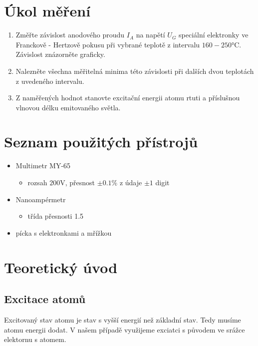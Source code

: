 \documentclass[titlepage]{article}
\begin{document}
\begin{titlepage}
 
\end{titlepage}

\tableofcontents
\newpage

\section{Úkol měření}

\begin{enumerate}
 \item Změřte závislost anodového proudu $I_A$ na napětí $U_G$ speciální elektronky ve Franckově - Hertzově pokusu při vybrané teplotě z intervalu $160  - 250 \si{\celsius}$. Závislost znázorněte graficky.

 \item Nalezněte všechna měřitelná minima této závislosti při dalších dvou teplotách z uvedeného intervalu.

 \item Z naměřených hodnot stanovte excitační energii atomu rtuti a příslušnou vlnovou délku emitovaného světla.
\end{enumerate}

\section{Seznam použitých přístrojů}
\begin{itemize}
\item Multimetr MY-65
 \begin{itemize}
  \item rozsah $200 \si{\volt}$, přesnost $\pm 0.1 \%$ z údaje $\pm 1$ digit
 \end{itemize}

\item Nanoampérmetr
 \begin{itemize}
  \item třída přesnosti 1.5
 \end{itemize}

\item pícka s elektronkami a mřížkou
\end{itemize}

\section{Teoretický úvod}
\subsection{Excitace atomů}
Excitovaný stav atomu je stav s vyšší energií než základní stav. Tedy musíme atomu energii dodat. V našem případě využijeme exciatci s původem ve srážce elektornu s atomem.
\end{document}
